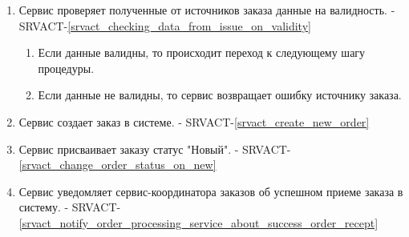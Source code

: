         \begin{alg} \label{alg_reception_order_service} \mbox{}

             \begin{enumerate}

               \item Сервис проверяет полученные от источников заказа данные на валидность. - SRVACT-\ref{srvact_checking_data_from_issue_on_validity}

                  \begin{enumerate}
               
                    \item Если данные валидны, то происходит переход к следующему шагу процедуры.
               
                    \item Если данные не валидны, то сервис возвращает ошибку источнику заказа.
               
                  \end{enumerate}
               
               \item Сервис создает заказ в системе. - SRVACT-\ref{srvact_create_new_order}
              
               \item Сервис присваивает заказу статус "Новый". - SRVACT-\ref{srvact_change_order_status_on_new}

               \item Сервис уведомляет сервис-координатора заказов об успешном приеме заказа в систему. - SRVACT-\ref{srvact_notify_order_processing_service_about_success_order_recept}

             \end{enumerate}

             \end{alg}


